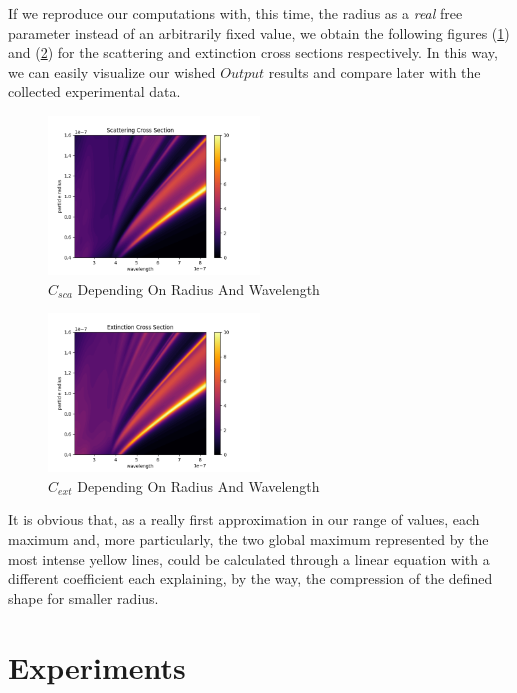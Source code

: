 \documentclass{article}
\numberwithin{equation}{section}
\begin{document}
If we reproduce our computations with, this time, the radius as a \textit{real} free parameter instead of an arbitrarily fixed value, we obtain the following figures (\ref{fig:surface_sca}) and (\ref{fig:surface_ext}) for the scattering and extinction cross sections respectively. In this way, we can easily visualize our wished $Output$ results and compare later with the collected experimental data.
\begin{figure}[h!]
    \centering
    \includegraphics[width=0.5\textwidth, height=0.4\textwidth]{surface_sca.png}
    \caption{$C_{sca}$ Depending On Radius And Wavelength}
    \label{fig:surface_sca}
\end{figure}
\begin{figure}[h!]
    \centering
    \includegraphics[width=0.5\textwidth, height=0.4\textwidth]{surface_ext.png}
    \caption{$C_{ext}$ Depending On Radius And Wavelength}
    \label{fig:surface_ext}
\end{figure}
It is obvious that, as a really first approximation in our range of values, each maximum and, more particularly, the two global maximum represented by the most intense yellow lines, could be calculated through a linear equation with a different coefficient each explaining, by the way, the compression of the defined shape for smaller radius.

\section{Experiments}
\end{document}
